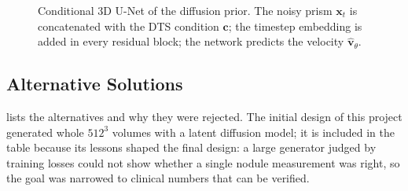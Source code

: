 \begin{figure}[htbp]
  \centering
  \resizebox{0.95\linewidth}{!}{}
  \caption[Conditional 3D U-Net of the diffusion prior]{Conditional 3D U-Net of the diffusion prior. The noisy prism $\mathbf{x}_t$ is concatenated with the DTS condition $\mathbf{c}$; the timestep embedding is added in every residual block; the network predicts the velocity $\hat{\mathbf{v}}_\theta$.}
  \label{fig:unet}
\end{figure}

\subsection{Alternative Solutions}

  lists the alternatives and why they were rejected. The initial design of this project generated whole $512^3$ volumes with a latent diffusion model; it is included in the table because its lessons shaped the final design: a large generator judged by training losses could not show whether a single nodule measurement was right, so the goal was narrowed to clinical numbers that can be verified.

